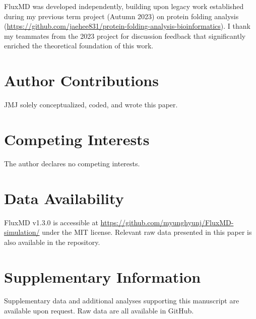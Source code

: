 \documentclass[pdflatex,sn-mathphys-num]{sn-jnl}
\begin{document}
\noindent FluxMD was developed independently, building upon legacy work established during my previous term project (Autumn 2023) on protein folding analysis (\href{https://github.com/jaehee831/protein-folding-analysis-bioinformatics}{https://github.com/jaehee831/protein-folding-analysis-bioinformatics}). I thank my teammates from the 2023 project for discussion feedback that significantly enriched the theoretical foundation of this work.

\section*{\protect\textbf{Author Contributions}}
JMJ solely conceptualized, coded, and wrote this paper.

\section*{\protect\textbf{Competing Interests}}
The author declares no competing interests.

\section*{\protect\textbf{Data Availability}}
FluxMD v1.3.0 is accessible at \url{https://github.com/myunghyunj/FluxMD-simulation/} under the MIT license. Relevant raw data presented in this paper is also available in the repository.

\section*{\protect\textbf{Supplementary Information}}
Supplementary data and additional analyses supporting this manuscript are available upon request. Raw data are all available in GitHub.



\end{document}
